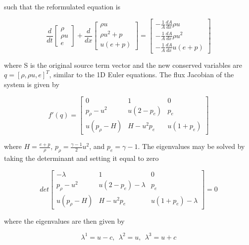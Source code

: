 \documentclass[11pt]{article}%
\numberwithin{equation}{section}
\begin{document}
such that the reformulated equation is 

\begin{equation}
\frac{d}{dt} \left[ \begin{array}{c} \rho  \\ \rho u  \\ e \end{array} \right] + \frac{d}{dx} \left[ \begin{array}{c} \rho u  \\ \rho u^2 + p \\ u(e + p) \end{array} \right] = \left[ \begin{array}{c} -\frac{1}{A}\frac{dA}{dx} \rho u \\ -\frac{1}{A} \frac{dA}{dx} \rho u^2  \\ -\frac{1}{A} \frac{dA}{dx}  u(e + p) \end{array} \right]
\end{equation}

where S is the original source term vector and the new conserved variables are $q = [\rho, \rho u, e]^T$, similar to the 1D Euler equations. The flux Jacobian of the system is given by

\begin{equation}
f'(q) = \left[ \begin{array}{ccc} 0 & 1 & 0 \\ p_{\rho} - u^2 &  u(2 - p_e) &  p_e \\  u(p_\rho - H) & H - u^2 p_e  &  u(1 + p_e) \end{array} \right] \label{1deulerjacobian}
\end{equation}

where $H = \frac{e + p}{\rho}$, $p_\rho = \frac{\gamma - 1}{2} u^2 $, and $p_e = \gamma - 1$. The eigenvalues may be solved by taking the determinant and setting it equal to zero

\begin{equation}
det \left[ \begin{array}{ccc} -\lambda & 1 & 0 \\ p_{\rho} - u^2 &  u(2 - p_e) - \lambda &  p_e \\  u(p_\rho - H) & H - u^2 p_e  &  u(1 + p_e) - \lambda \end{array} \right] = 0
\end{equation}

where the eigenvalues are then given by 

\begin{equation}
\lambda^1 = u - c,  \ \ \lambda^2 =u , \ \ \lambda^3 = u + c \label{eigval}
\end{equation}
\end{document}
